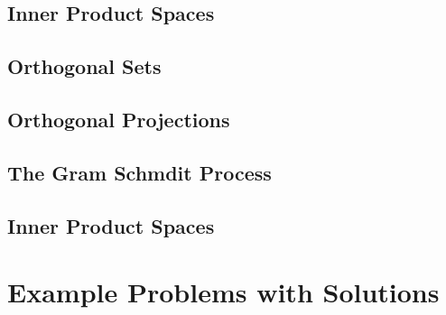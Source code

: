 \documentclass{article}
\begin{document}
\subsection{Inner Product Spaces}
\subsection{Orthogonal Sets}
\subsection{Orthogonal Projections}
\subsection{The Gram Schmdit Process}
\subsection{Inner Product Spaces}




\pagebreak
\section{Example Problems with Solutions}
\end{document}

